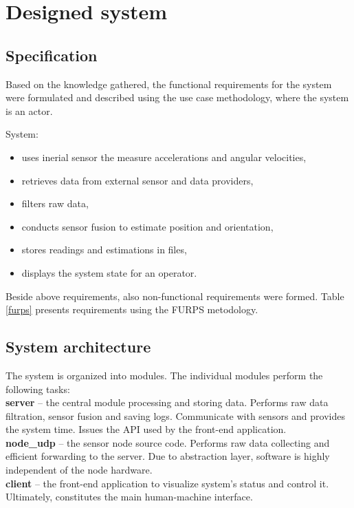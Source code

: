\chapter{Designed system}

\section{Specification}

Based on the knowledge gathered, the functional requirements for the system were formulated and described using the use case methodology, where the system is an actor.

System:
\begin{itemize}
	\item uses inerial sensor the measure accelerations and angular velocities,
	\item retrieves data from external sensor and data providers,
	\item filters raw data,
	\item conducts sensor fusion to estimate position and orientation,
	\item stores readings and estimations in files,
	\item displays the system state for an operator.
\end{itemize}

Beside above requirements, also non-functional requirements were formed. Table \ref{furps} presents requirements using the FURPS metodology.

\section{System architecture}

The system is organized into modules. The individual modules perform the following tasks:\\

\noindent\textbf{server} -- the central module processing and storing data. Performs raw data filtration, sensor fusion and saving logs. Communicate with sensors and provides the system time. Issues the API used by the front-end application.\\

\noindent\textbf{node\_udp} -- the sensor node source code. Performs raw data collecting and efficient forwarding to the server. Due to abstraction layer, software is highly independent of the node hardware.\\

\noindent\textbf{client} -- the front-end application to visualize system's status and control it. Ultimately, constitutes the main human-machine interface.\\

